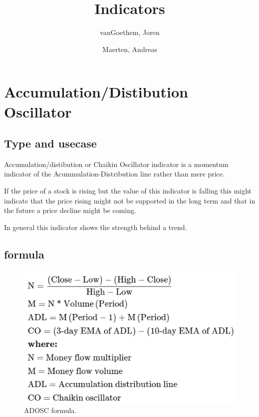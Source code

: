 \documentclass[12pt,a4paper]{article}
\begin{document}
\begin{titlepage}
    \author{
        vanGoethem, Joren
        \and
        Maerten, Andreas
    }
    \title{Indicators}
\end{titlepage}

\maketitle
\newpage
\tableofcontents
\newpage


\section{Accumulation/Distibution Oscillator}

\subsection{Type and usecase}
Accumulation/distibution or Chaikin Oscillator indicator is a momentum indicator of the Acummulation-Distribution line rather than mere price.

If the price of a stock is rising but the value of this indicator is falling this might indicate that the price rising might not be supported in the long term and that in the future a price decline might be coming.

In general this indicator shows the strength behind a trend.

\subsection{formula}

\begin{figure}[H]
    \includegraphics[scale=0.7]{../images/ADOSC.png}
    \caption{ADOSC formula.}
    \label{fig:ADOSC}
\end{figure}
\end{document}
